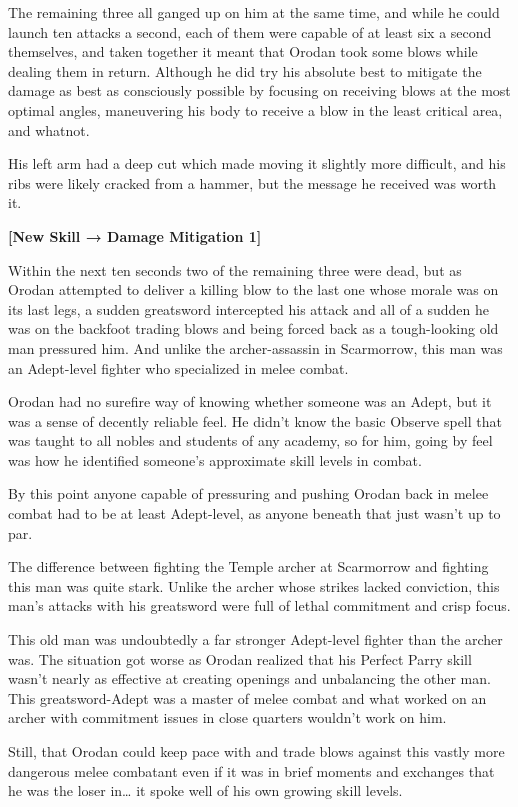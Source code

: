 \documentclass[a4paper,10pt]{book}
\begin{document}
The remaining three all ganged up on him at the same time, and while he could launch ten attacks a second, each of them were capable of at least six a second themselves, and taken together it meant that Orodan took some blows while dealing them in return. Although he did try his absolute best to mitigate the damage as best as consciously possible by focusing on receiving blows at the most optimal angles, maneuvering his body to receive a blow in the least critical area, and whatnot.\par
His left arm had a deep cut which made moving it slightly more difficult, and his ribs were likely cracked from a hammer, but the message he received was worth it.\par
\textbf{[New Skill → Damage Mitigation 1]}\par
Within the next ten seconds two of the remaining three were dead, but as Orodan attempted to deliver a killing blow to the last one whose morale was on its last legs, a sudden greatsword intercepted his attack and all of a sudden he was on the backfoot trading blows and being forced back as a tough-looking old man pressured him. And unlike the archer-assassin in Scarmorrow, this man was an Adept-level fighter who specialized in melee combat.\par
Orodan had no surefire way of knowing whether someone was an Adept, but it was a sense of decently reliable feel. He didn’t know the basic Observe spell that was taught to all nobles and students of any academy, so for him, going by feel was how he identified someone’s approximate skill levels in combat.\par
By this point anyone capable of pressuring and pushing Orodan back in melee combat had to be at least Adept-level, as anyone beneath that just wasn’t up to par.\par
The difference between fighting the Temple archer at Scarmorrow and fighting this man was quite stark. Unlike the archer whose strikes lacked conviction, this man’s attacks with his greatsword were full of lethal commitment and crisp focus.\par
This old man was undoubtedly a far stronger Adept-level fighter than the archer was. The situation got worse as Orodan realized that his Perfect Parry skill wasn’t nearly as effective at creating openings and unbalancing the other man. This greatsword-Adept was a master of melee combat and what worked on an archer with commitment issues in close quarters wouldn’t work on him.\par
Still, that Orodan could keep pace with and trade blows against this vastly more dangerous melee combatant even if it was in brief moments and exchanges that he was the loser in… it spoke well of his own growing skill levels.\par
\end{document}
